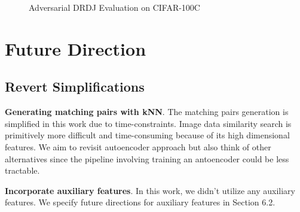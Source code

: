 \documentclass{article}
\begin{document}
\begin{figure}
  \centering
    \qquad
    \caption{Adversarial DRDJ Evaluation on CIFAR-100C}%
    \label{fig:adversarial_DRDJ_evaluation}%
\end{figure}


\section{Future Direction}
\subsection{Revert Simplifications}
\textbf{Generating matching pairs with kNN}.
The matching pairs generation is simplified in this work due to time-constraints.
Image data similarity search is primitively more difficult and time-consuming
because of its high dimensional features. We aim to revisit autoencoder 
approach but also think of other alternatives since the pipeline involving 
training an antoencoder could be less tractable.


\textbf{Incorporate auxiliary features}. In this work, we didn't utilize any auxiliary features. We specify future 
directions for auxiliary features in Section 6.2. 
\end{document}
